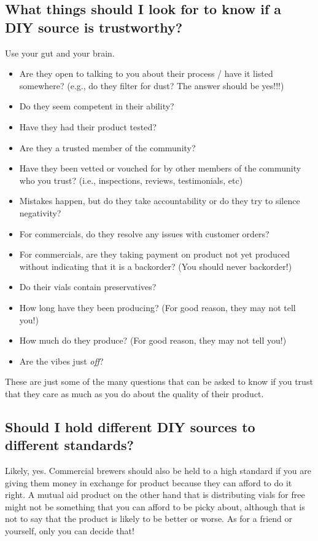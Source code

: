 \documentclass{article}
\begin{document}
{{\subsection{What things should I look for to know if a DIY source is trustworthy?}

Use your gut and your brain. 

\begin{itemize}
  \item Are they open to talking to you about their process / have it listed somewhere? (e.g., do they filter for dust? The answer should be yes!!!)
  \item Do they seem competent in their ability?
  \item Have they had their product tested? 
  \item Are they a trusted member of the community?
  \item Have they been vetted or vouched for by other members of the community who you trust? (i.e., inspections, reviews, testimonials, etc)
  \item Mistakes happen, but do they take accountability or do they try to silence negativity?
  \item For commercials, do they resolve any issues with customer orders?
  \item For commercials, are they taking payment on product not yet produced without indicating that it is a backorder? (You should never backorder!)
  \item Do their vials contain preservatives?
  \item How long have they been producing? (For good reason, they may not tell you!)
  \item How much do they produce? (For good reason, they may not tell you!)
  \item Are the vibes just \textit{off}?
\end{itemize}

These are just some of the many questions that can be asked to know if you trust that they care as much as you do about the quality of their product.

\subsection{Should I hold different DIY sources to different standards?}

Likely, yes. Commercial brewers should also be held to a high standard if you are giving them money in exchange for product because they can afford to do it right. A mutual aid product on the other hand that is distributing vials for free might not be something that you can afford to be picky about, although that is not to say that the product is likely to be better or worse. As for a friend or yourself, only you can decide that!

}}
\end{document}
